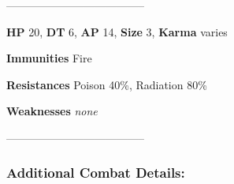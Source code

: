 \documentclass[11pt,a4paper,twocolumn]{book}
\begin{document}
	--------------------------------------
	
	\noindent
	\textbf{HP} 20, \textbf{DT} 6, \textbf{AP} 14, \textbf{Size} 3, \textbf{Karma} varies
	
	
	\noindent
	\textbf{Immunities} Fire
	
	\noindent
	\textbf{Resistances} Poison 40\%, Radiation 80\%
	
	\noindent
	\textbf{Weaknesses} \emph{none} %
	
	--------------------------------------
	
	\subsubsection*{Additional Combat Details:}
\end{document}
